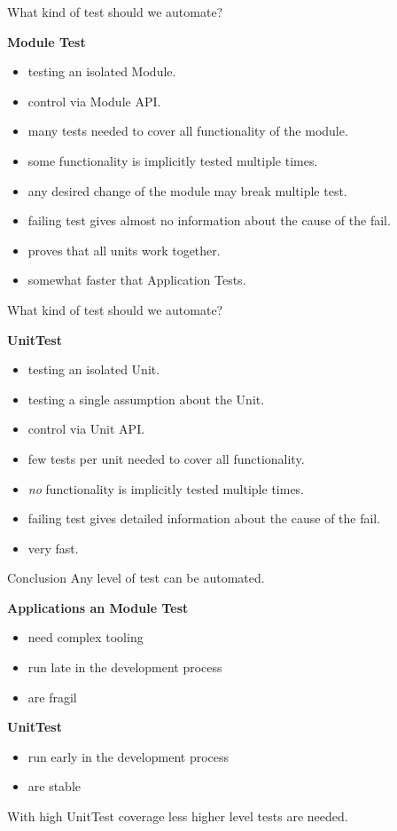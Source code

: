 \documentclass[SoftwareQuality.tex]{subfiles}
\begin{document}
\begin{frame}{What kind of test should we automate?} 

\textbf{Module Test}
\begin{itemize}
\item testing an isolated Module.
\item control via Module API.
\item many tests needed to cover all functionality of the module.
\item some functionality is implicitly tested multiple times.
\item any desired change of the module may break multiple test.
\item failing test gives almost no information about the cause of the fail.
\item proves that all units work together.
\item somewhat faster that Application Tests.
\end{itemize}

\end{frame}

\begin{frame}{What kind of test should we automate?} 

\textbf{UnitTest}
\begin{itemize}
\item testing an isolated Unit.
\item testing a single assumption about the Unit.
\item control via Unit API.
\item few tests per unit needed to cover all functionality.
\item \textit{no} functionality is implicitly tested multiple times.
\item failing test gives detailed information about the cause of the fail.
\item very fast.
\end{itemize}

\end{frame}

\begin{frame}{Conclusion} 
Any level of test can be automated.
\vfill

\textbf{Applications an Module  Test}
\begin{itemize}
\item need complex tooling
\item run late in the development process
\item are fragil
\end{itemize}

\textbf{UnitTest}
\begin{itemize}
\item run early in the development process
\item are stable
\end{itemize}
\vfill

With high UnitTest coverage less higher level  tests are needed.

\end{frame}
\end{document}
